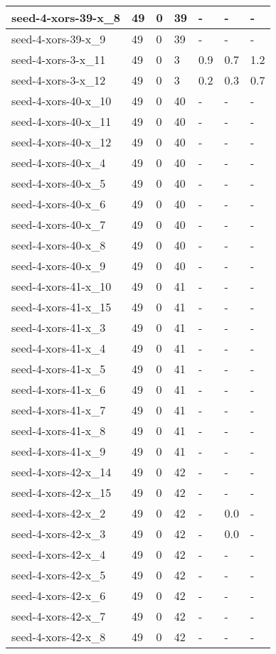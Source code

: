 \begin{scriptsize}
\begin{longtable}{|p{5cm}|l|l|l|l|l|l|}
seed-4-xors-39-x\_8&49&0&39&-&-&- \\ \hline 
seed-4-xors-39-x\_9&49&0&39&-&-&- \\ \hline 
seed-4-xors-3-x\_11&49&0&3&0.9&0.7&1.2 \\ \hline 
seed-4-xors-3-x\_12&49&0&3&0.2&0.3&0.7 \\ \hline 
seed-4-xors-40-x\_10&49&0&40&-&-&- \\ \hline 
seed-4-xors-40-x\_11&49&0&40&-&-&- \\ \hline 
seed-4-xors-40-x\_12&49&0&40&-&-&- \\ \hline 
seed-4-xors-40-x\_4&49&0&40&-&-&- \\ \hline 
seed-4-xors-40-x\_5&49&0&40&-&-&- \\ \hline 
seed-4-xors-40-x\_6&49&0&40&-&-&- \\ \hline 
seed-4-xors-40-x\_7&49&0&40&-&-&- \\ \hline 
seed-4-xors-40-x\_8&49&0&40&-&-&- \\ \hline 
seed-4-xors-40-x\_9&49&0&40&-&-&- \\ \hline 
seed-4-xors-41-x\_10&49&0&41&-&-&- \\ \hline 
seed-4-xors-41-x\_15&49&0&41&-&-&- \\ \hline 
seed-4-xors-41-x\_3&49&0&41&-&-&- \\ \hline 
seed-4-xors-41-x\_4&49&0&41&-&-&- \\ \hline 
seed-4-xors-41-x\_5&49&0&41&-&-&- \\ \hline 
seed-4-xors-41-x\_6&49&0&41&-&-&- \\ \hline 
seed-4-xors-41-x\_7&49&0&41&-&-&- \\ \hline 
seed-4-xors-41-x\_8&49&0&41&-&-&- \\ \hline 
seed-4-xors-41-x\_9&49&0&41&-&-&- \\ \hline 
seed-4-xors-42-x\_14&49&0&42&-&-&- \\ \hline 
seed-4-xors-42-x\_15&49&0&42&-&-&- \\ \hline 
seed-4-xors-42-x\_2&49&0&42&-&0.0&- \\ \hline 
seed-4-xors-42-x\_3&49&0&42&-&0.0&- \\ \hline 
seed-4-xors-42-x\_4&49&0&42&-&-&- \\ \hline 
seed-4-xors-42-x\_5&49&0&42&-&-&- \\ \hline 
seed-4-xors-42-x\_6&49&0&42&-&-&- \\ \hline 
seed-4-xors-42-x\_7&49&0&42&-&-&- \\ \hline 
seed-4-xors-42-x\_8&49&0&42&-&-&- \\ \hline 

\end{longtable}
\end{scriptsize}
